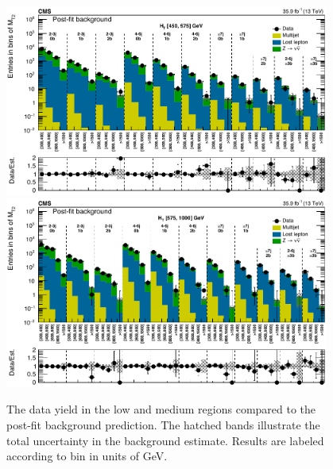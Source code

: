 \begin{figure}
	\centering
	\includegraphics[width=0.95\textwidth]{results/figs/postfit/mt2_lowHT_fullEstimate}
	\includegraphics[width=0.95\textwidth]{results/figs/postfit/mt2_mediumHT_fullEstimate}
	\renewcommand{\baselinestretch}{1.0}
	\caption[The data yield in the low \HT and medium \HT regions compared to the post-fit background prediction.]{The data yield in the low \HT and medium \HT regions compared to the post-fit background prediction. The hatched bands illustrate the total uncertainty in the background estimate. Results are labeled according to \mttwo bin in units of GeV.}
	\label{fig:yieldPostfit2}
\end{figure}
